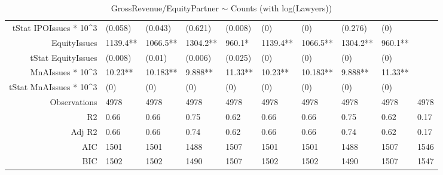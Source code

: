 \begin{table}[ht]
\begin{tabular}{rlllllllll}
  tStat IPOIssues * 10^3 & (0.058) & (0.043) & (0.621) & (0.008) & (0) & (0) & (0.276) & (0) &  \\ 
  EquityIssues & 1139.4** & 1066.5** & 1304.2** & 960.1* & 1139.4** & 1066.5** & 1304.2** & 960.1** &  \\ 
  tStat EquityIssues & (0.008) & (0.01) & (0.006) & (0.025) & (0) & (0) & (0) & (0) &  \\ 
  MnAIssues * 10^3 & 10.23** & 10.183** & 9.888** & 11.33** & 10.23** & 10.183** & 9.888** & 11.33** &  \\ 
  tStat MnAIssues * 10^3 & (0) & (0) & (0) & (0) & (0) & (0) & (0) & (0) &  \\ 
  Observations & 4978 & 4978 & 4978 & 4978 & 4978 & 4978 & 4978 & 4978 & 4978 \\ 
  R2 & 0.66 & 0.66 & 0.75 & 0.62 & 0.66 & 0.66 & 0.75 & 0.62 & 0.17 \\ 
  Adj R2 & 0.66 & 0.66 & 0.74 & 0.62 & 0.66 & 0.66 & 0.74 & 0.62 & 0.17 \\ 
  AIC & 1501 & 1501 & 1488 & 1507 & 1501 & 1501 & 1488 & 1507 & 1546 \\ 
  BIC & 1502 & 1502 & 1490 & 1507 & 1502 & 1502 & 1490 & 1507 & 1547 \\ 
   \hline
\end{tabular}
\caption{GrossRevenue/EquityPartner $\sim$ Counts (with log(Lawyers))} 
\end{table}
